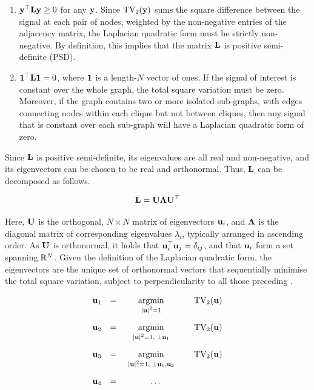 \begin{enumerate}
    \item $\mathbf{y}^\top \mathbf{L} \mathbf{y} \geq 0$ for any $\mathbf{y}$. Since $\text{TV}_2(\mathbf{y})$ sums the square difference between the signal at each pair of nodes, weighted by the non-negative entries of the adjacency matrix, the Laplacian quadratic form must be strictly non-negative. By definition, this implies that the matrix $\mathbf{L}$ is positive semi-definite (PSD). 
    \item $\mathbf{1}^\top \mathbf{L} \mathbf{1} = 0$, where $\mathbf{1}$ is a length-$N$ vector of ones. If the signal of interest is constant over the whole graph, the total square variation must be zero. Moreover, if the graph contains two or more isolated sub-graphs, with edges connecting nodes within each clique but not between cliques, then any signal that is constant over each sub-graph will have a Laplacian quadratic form of zero. 
\end{enumerate}

Since $\mathbf{L}$ is positive semi-definite, its eigenvalues are all real and non-negative, and its eigenvectors can be chosen to be real and orthonormal. Thus, $\mathbf{L}$ can be decomposed as follows. 

\begin{equation}
    \mathbf{L} = \mathbf{U} \mathbf{\Lambda} \mathbf{U}^\top
\end{equation}

Here, $\mathbf{U}$ is the orthogonal, $N \times N$ matrix of eigenvectors ${\mathbf{u}_i}$, and $\mathbf{\Lambda}$ is the diagonal matrix of corresponding eigenvalues ${\lambda_i}$, typically arranged in ascending order. As $\mathbf{U}$ is orthonormal, it holds that $\mathbf{u}_i^\top \mathbf{u}_j = \delta_{ij}$, and that ${\mathbf{u}_i}$ form a set spanning $\mathbb{R}^N$. Given the definition of the Laplacian quadratic form, the eigenvectors are the unique set of orthonormal vectors that sequentially minimise the total square variation, subject to perpendicularity to all those preceding \citep{Spielman2019}.


$$
\begin{matrix}
    \uu_1 & = & \underset{\raisebox{-0.1cm} { $ \scriptstyle |\uu|^2 = 1$ }}{\text{argmin}} \quad & \text{TV}_2(\uu) \\[0.7cm]
    \uu_2 & = & \underset{\raisebox{-0.1cm} { $ \scriptstyle |\uu|^2 = 1, \; \perp \uu_1$ }}{\text{argmin}} \quad & \text{TV}_2(\uu) \\[0.7cm]
    \uu_3 & = & \underset{\raisebox{-0.1cm} { $ \scriptstyle |\uu|^2 = 1, \;\perp \uu_1, \uu_2$ }}{\text{argmin}} \quad & \text{TV}_2(\uu) \\[0.7cm]
    \uu_4 & = & \ldots
\end{matrix}
$$

